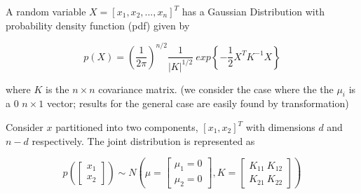 

%
\label{App_A}


A random variable $X= [x_1,x_2,...,x_n]^T$ has a Gaussian Distribution  with probability density function (pdf) given by

\begin{equation}\label{eq1}
p(X) = \left(\frac{1}{2\pi}\right)^{n/2} \frac{1}{|K|^{1/2}} \ exp\left\{-\frac{1}{2}X^TK^{-1}X\right\}
\end{equation}

where $K$ is the $n \times n$ covariance matrix. (we consider the case where the the $\mu_i$ is a $0$ $n \times 1$ vector; results for the general case are easily found by transformation)

Consider $x$ partitioned into two components, $[x_1,x_2]^T$ with dimensions $d$ and $n-d$ respectively. The joint distribution is represented as

\begin{equation}\label{eq2}
p\left(\left[\begin{array}{c}x_1\\ x_2\end{array}\right]\right) \sim N\left(\mu = \left[\begin{array}{c}{\mu }_{1}=0\\ {\mu }_{2}=0\end{array}\right],K =\left[\begin{array}{cc}{K}_{11} \ {K}_{12}\\ {K}_{21}\ {K}_{22}\end{array}\right]\right)
\end{equation}

